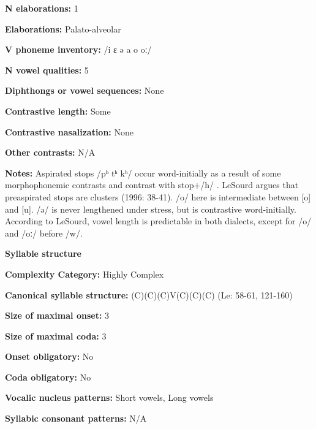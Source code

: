 \textbf{N elaborations:} 1



\textbf{Elaborations:} Palato-alveolar



\textbf{V phoneme inventory:} /i ɛ ə a o oː/



\textbf{N vowel qualities:} 5



\textbf{Diphthongs or vowel sequences:} None



\textbf{Contrastive length:} Some



\textbf{Contrastive nasalization:} None



\textbf{Other contrasts:} N/A



\textbf{Notes:} Aspirated stops /pʰ tʰ kʰ/ occur word-initially as a result of some morphophonemic contrasts and contrast with stop+/h/ \citep{Sherwood1986}. LeSourd argues that preaspirated stops are clusters (1996: 38-41). /o/ here is intermediate between [o] and [u]. /ə/ is never lengthened under stress, but is contrastive word-initially. According to LeSourd, vowel length is predictable in both dialects, except for /o/ and /oː/ before /w/.



\textbf{Syllable structure}



\textbf{Complexity Category:} Highly Complex



\textbf{Canonical syllable structure:} (C)(C)(C)V(C)(C)(C) (Le\citealt{Sourd1993}: 58-61, 121-160)



\textbf{Size of maximal onset:} 3



\textbf{Size of maximal coda:} 3



\textbf{Onset obligatory:} No



\textbf{Coda obligatory:} No



\textbf{Vocalic nucleus patterns:} Short vowels, Long vowels



\textbf{Syllabic consonant patterns:} N/A



